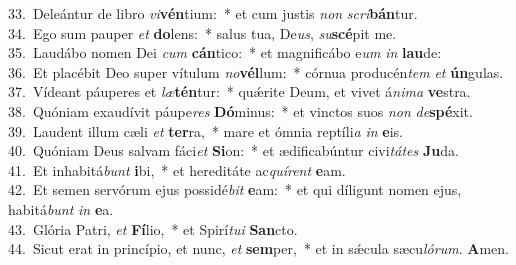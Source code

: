 {33.~}Deleántur de libro \textit{vi}\textbf{vén}tium:~* et cum justis \textit{non} \textit{scri}\textbf{bán}tur.\\
{34.~}Ego sum pauper \textit{et} \textbf{do}lens:~* salus tua, De\textit{us}, \textit{su}\textbf{scé}pit me.\\
{35.~}Laudábo nomen Dei \textit{cum} \textbf{cán}tico:~* et magnificábo e\textit{um} \textit{in} \textbf{lau}de:\\
{36.~}Et placébit Deo super vítulum \textit{no}\textbf{vél}lum:~* córnua producén\textit{tem} \textit{et} \textbf{ún}gulas.\\
{37.~}Vídeant páuperes et \textit{læ}\textbf{tén}tur:~* quǽrite Deum, et vivet á\textit{ni}\textit{ma} \textbf{ve}stra.\\
{38.~}Quóniam exaudívit páupe\textit{res} \textbf{Dó}minus:~* et vinctos suos \textit{non} \textit{de}\textbf{spé}xit.\\
{39.~}Laudent illum cæli \textit{et} \textbf{ter}ra,~* mare et ómnia reptíli\textit{a} \textit{in} \textbf{e}is.\\
{40.~}Quóniam Deus salvam fáci\textit{et} \textbf{Si}on:~* et ædificabúntur civi\textit{tá}\textit{tes} \textbf{Ju}da.\\
{41.~}Et inhabitá\textit{bunt} \textbf{i}bi,~* et hereditáte ac\textit{quí}\textit{rent} \textbf{e}am.\\
{42.~}Et semen servórum ejus possidé\textit{bit} \textbf{e}am:~* et qui díligunt nomen ejus, habitá\textit{bunt} \textit{in} \textbf{e}a.\\
{43.~}Glória Patri, \textit{et} \textbf{Fí}lio,~* et Spirí\textit{tu}\textit{i} \textbf{San}cto.\\
{44.~}Sicut erat in princípio, et nunc, \textit{et} \textbf{sem}per,~* et in sǽcula sæcu\textit{ló}\textit{rum}. \textbf{A}men.\\
